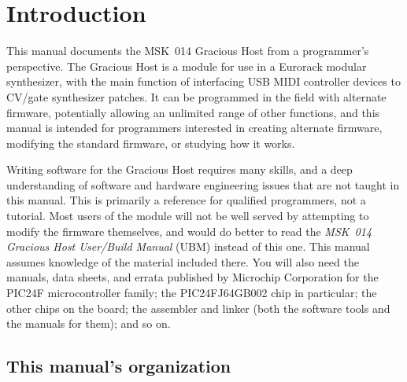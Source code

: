 
%
%
%
%
%
%

\chapter{Introduction}

This manual documents the MSK~014 Gracious Host from a programmer's
perspective.  The Gracious Host is a module for use in a Eurorack modular
synthesizer, with the main function of interfacing USB MIDI controller
devices to CV/gate synthesizer patches.  It can be programmed in the field
with alternate firmware, potentially allowing an unlimited range of other
functions, and this manual is intended for programmers interested in
creating alternate firmware, modifying the standard firmware, or studying
how it works.

Writing software for the Gracious Host requires many skills, and a deep
understanding of software and hardware engineering issues that are not taught
in this manual.  This is primarily a reference for qualified programmers,
not a tutorial.  Most users of the module will not be well served by
attempting to modify the firmware themselves, and would do better to read
the \emph{MSK~014 Gracious Host User/Build Manual} (UBM) instead of this
one.  This manual assumes knowledge of the material included there.  You
will also need the manuals, data sheets, and errata published by Microchip
Corporation for the PIC24F microcontroller family; the PIC24FJ64GB002 chip
in particular; the other chips on the board; the assembler and linker (both
the software tools and the manuals for them); and so on.

\section{This manual's organization}

